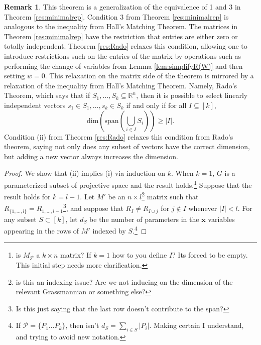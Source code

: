 \documentclass[11pt]{article}
\newcommand{\cP}{\mathcal{P}}
\theoremstyle{remark}
\theoremstyle{definition}
\newtheorem{rmk}[thm]{Remark}
\begin{document}
\begin{appendices}
\begin{rmk}
This theorem is a generalization of the equivalence of 1 and 3 in Theorem \ref{res:minimalrep}. Condition 3 from Theorem \ref{res:minimalrep} is analogous to the inequality from Hall's Matching Theorem.
The matrices in Theorem \ref{res:minimalrep} have the restriction that entries are either zero or totally independent. Theorem \ref{res:Rado} relaxes this condition, allowing one to introduce restrictions such on the entries of the matrix by operations such as performing the change of variables from Lemma \ref{lem:simplifyR(W)} and then setting $w = 0$. This relaxation on the matrix side of the theorem is mirrored by a relaxation of the inequality from Hall's Matching Theorem. Namely, Rado's Theorem, which says that if $S_1, \dots, S_k \subseteq \mathbb{R}^{n}$, then it is possible to select linearly independent vectors $s_1 \in S_1, \dots, s_k \in S_k$ if and only if for all $I \subseteq [k]$,
%
\begin{displaymath}
\mathrm{dim}\left(\mathrm{span}\left( \bigcup_{i \in I} S_i \right) \right) \geq |I|.
\end{displaymath}
%
\noindent
Condition (ii) from Theorem \ref{res:Rado} relaxes this condition from Rado's theorem, saying not only does any subset of vectors have the correct dimension, but adding a new vector always increases the dimension.
\end{rmk}

\begin{proof}
We show that (ii) implies (i) via induction on $k$. When $k = 1$, $G$ is a parameterized subset of projective space and the result holds.\footnote{is $M_\cP$ a $k \times n$ matrix? If $k =1$ how to you define $I$? Its forced to be empty. This initial step needs more clarification.} Suppose that the result holds for $k = l-1$. Let $M'$ be an $n \times l$\footnote{is this an indexing issue? Are we not inducing on the dimension of the relevant Grassmannian or something else?} matrix such that $R_{\{1,\dots,l\}} = R_{1,\dots,l-1}$\footnote{Is this just saying that the last row doesn't contribute to the span?}, and suppose that $R_I \neq R_{I \cup j}$ for $j \notin I$ whenever $|I| < l$. For any subset $S \subset [k]$, let $d_S$ be the number of parameters in the $\mathbf{x}$ variables appearing in the rows of $M'$ indexed by $S$.\footnote{If $\cP = \{ P_1 \ldots P_k\}$, then isn't $d_S = \sum_{i \in S}|P_i|$. Making certain I understand, and trying to avoid new notation.}


\end{proof}
\end{appendices}
\end{document}
